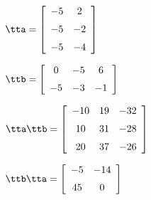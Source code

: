 {$\tta = \left[ \begin {array}{cc} -5&2\\\noalign{\medskip}-5&-2
\\\noalign{\medskip}-5&-4\end {array} \right]$ 

$\ttb = \left[ \begin {array}{ccc} 0&-5&6\\\noalign{\medskip}-5&-3&-1
\end {array} \right] $}
{$\tta\ttb = \left[ \begin {array}{ccc} -10&19&-32\\\noalign{\medskip}10&31&-28
\\\noalign{\medskip}20&37&-26\end {array} \right] $

$\ttb\tta = \left[ \begin {array}{cc} -5&-14\\\noalign{\medskip}45&0\end {array} \right] $}


